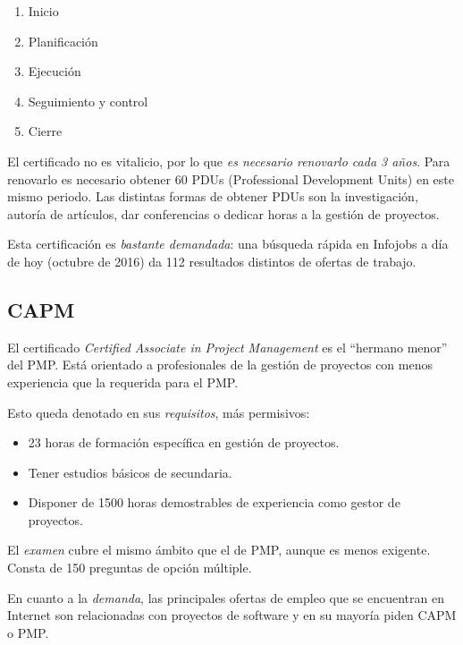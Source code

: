 \begin{enumerate}
\item Inicio
\item Planificación
\item Ejecución
\item Seguimiento y control
\item Cierre
\end{enumerate}

El certificado no es vitalicio, por lo que \emph{es necesario renovarlo cada 3 años}. Para renovarlo es necesario obtener 60 PDUs (Professional Development Units) en este mismo periodo. Las distintas formas de obtener PDUs son la investigación, autoría de artículos, dar conferencias o dedicar horas a la gestión de proyectos.

Esta certificación es \emph{bastante demandada}: una búsqueda rápida en Infojobs a día de hoy (octubre de 2016) da 112 resultados distintos de ofertas de trabajo.

\subsection{CAPM}

El certificado \emph{Certified Associate in Project Management} es el ``hermano menor'' del PMP. Está orientado a profesionales de la gestión de proyectos con menos experiencia que la requerida para el PMP.

Esto queda denotado en sus \emph{requisitos}, más permisivos:

\begin{itemize}
\item 23 horas de formación específica en gestión de proyectos.
\item Tener estudios básicos de secundaria.
\item Disponer de 1500 horas demostrables de experiencia como gestor de proyectos.
\end{itemize}

El \emph{examen} cubre el mismo ámbito que el de PMP, aunque es menos exigente. Consta de 150 preguntas de opción múltiple.

En cuanto a la \emph{demanda}, las principales ofertas de empleo que se encuentran en Internet son relacionadas con proyectos de software y en su mayoría piden CAPM o PMP.
